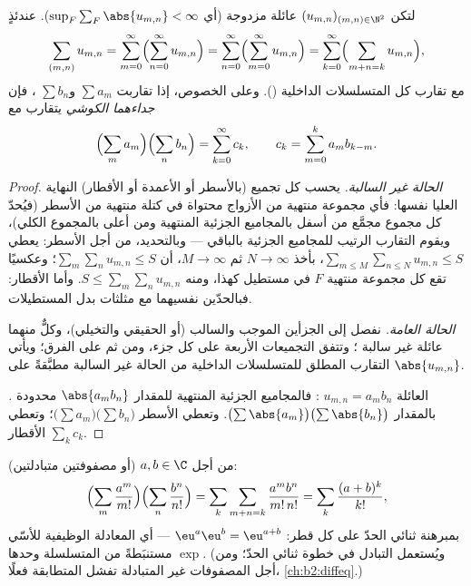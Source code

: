 \begin{theorem}\label{thm:b2:series:fubini}
لتكن $(u_{m,n})_{(m,n) \in \N^2}$ عائلة مزدوجة  (أي
$\sup_F \sum_F \abs{u_{m,n}} < \infty$). عندئذٍ
\[
\sum_{(m,n)} u_{m,n}
= \sum_{m=0}^{\infty}\Bigl(\sum_{n=0}^{\infty} u_{m,n}\Bigr)
= \sum_{n=0}^{\infty}\Bigl(\sum_{m=0}^{\infty} u_{m,n}\Bigr)
= \sum_{k=0}^{\infty}\Bigl(\sum_{m+n=k} u_{m,n}\Bigr),
\]
مع تقارب كل المتسلسلات الداخلية (). وعلى الخصوص، إذا تقاربت $\sum
a_m$ و$\sum b_n$ ، فإن \emph{جداءهما
الكوشي} يتقارب  مع
\[
\Bigl(\sum_m a_m\Bigr)\Bigl(\sum_n b_n\Bigr)
= \sum_{k=0}^{\infty} c_k,
\qquad
c_k = \sum_{m=0}^{k} a_m b_{k-m} .
\]
\end{theorem}

\begin{proof}
\emph{الحالة غير السالبة.} يحسب كل تجميع (بالأسطر أو الأعمدة أو
الأقطار) النهاية العليا نفسها: فأي مجموعة منتهية من الأزواج
محتواة في كتلة منتهية من الأسطر (فيُحدّ كل مجموع مجمَّع من أسفل
بالمجاميع الجزئية المنتهية ومن أعلى بالمجموع الكلي)، ويقوم التقارب
الرتيب للمجاميع الجزئية بالباقي --- وبالتحديد، من أجل الأسطر:
يعطي $\sum_{m \leq M}\sum_{n \leq N} u_{m,n} \leq S$، بأخذ $N
\to \infty$ ثم $M \to \infty$، أن $\sum_m \sum_n u_{m,n} \leq S$؛
وعكسيًا تقع كل مجموعة منتهية $F$ في مستطيل كهذا، ومنه $S \leq
\sum_m\sum_n u_{m,n}$. وأما الأقطار: فبالحدّين نفسيهما مع مثلثات
بدل المستطيلات.

\emph{الحالة العامة.} نفصل إلى الجزأين الموجب والسالب (أو الحقيقي
والتخيلي)، وكلٌّ منهما عائلة غير سالبة ؛ وتتفق التجميعات
الأربعة على كل جزء، ومن ثم على الفرق؛ ويأتي التقارب المطلق
للمتسلسلات الداخلية من الحالة غير السالبة
مطبَّقةً على $\abs{u_{m,n}}$.

\emph{.} العائلة $u_{m,n} = a_m b_n$ : فالمجاميع
الجزئية المنتهية للمقدار $\abs{a_mb_n}$ محدودة بالمقدار
$\bigl(\sum\abs{a_m}\bigr)\bigl(\sum\abs{b_n}\bigr)$. وتعطي الأسطر
$\bigl(\sum a_m\bigr)\bigl(\sum b_n\bigr)$؛ وتعطي الأقطار $\sum_k
c_k$.
\end{proof}

\begin{example}\label{ex:b2:series:exp}
من أجل $a, b \in \C$ (أو مصفوفتين متبادلتين):
\[
\Bigl(\sum_m \frac{a^m}{m!}\Bigr)\Bigl(\sum_n
\frac{b^n}{n!}\Bigr)
= \sum_k \sum_{m+n=k} \frac{a^m b^n}{m!\,n!}
= \sum_k \frac{(a + b)^k}{k!},
\]
بمبرهنة ثنائي الحدّ على كل قطر: $\eu^a \eu^b = \eu^{a+b}$
--- أي المعادلة الوظيفية للأسّي $\exp$ مستنبَطةً من المتسلسلة وحدها.
(ويُستعمل التبادل في خطوة ثنائي الحدّ؛ ومن أجل المصفوفات غير
المتبادلة تفشل المتطابقة فعلًا،
\cref{ch:b2:diffeq}.)
\end{example}

